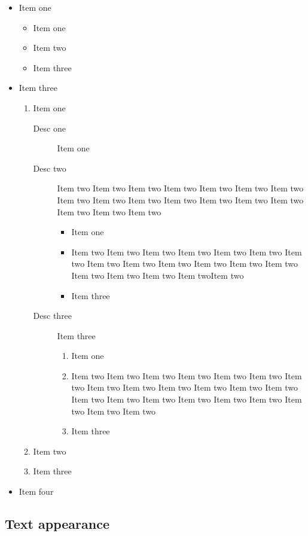 \begin{itemize}
  \item Item one
  \begin{itemize}
    \item Item one
    \item Item two
    \item Item three
  \end{itemize}
  \item Item three
  \begin{enumerate}
    \item Item one
    \begin{description}
      \item[Desc one] Item one
      \item[Desc two] Item two Item two Item two Item two Item two
Item two Item two Item two Item two Item two Item two Item two Item
two Item two Item two Item two Item two
      \begin{itemize}
        \item Item one
        \item Item two Item two Item two Item two Item two Item
        two Item two Item two Item two Item two Item two Item two
        Item two Item
        two Item two Item two Item twoItem two
        \item Item three
      \end{itemize}
      \item[Desc three] Item three
      \begin{enumerate}
        \item Item one
        \item Item two Item two Item two Item two Item two Item two
        Item two Item two Item two Item two Item two Item two
        Item two Item
        two Item two Item two Item two Item two Item two Item two Item two Item
        two
        \item Item three
      \end{enumerate}
    \end{description}
    \item Item two
    \item Item three
  \end{enumerate}
  \item Item four
\end{itemize}

\subsection{Text appearance}

